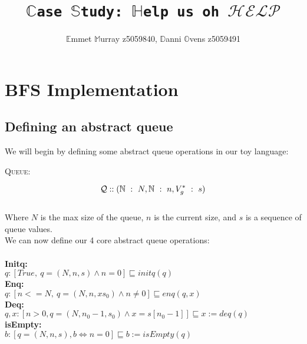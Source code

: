 \documentclass[a4paper]{scrartcl}
\title{\texttt{$\mathbb{C}$ase $\mathbb{S}$tudy: $\mathbb{H}$elp us oh $\mathcal{HELP}$}}
\author{$\mathbb{E}$mmet $\mathbb{M}$urray z5059840, $\mathbb{D}$anni $\mathbb{O}$vens z5059491}
\newcommand{\N}{\mathbb{N}}
\newcommand{\refinedby}{\sqsubseteq} %
\begin{document}
\maketitle
\section{BFS Implementation}
%
\subsection{Defining an abstract queue}
We will begin by defining some abstract queue operations in our toy language: \\
\begin{center}
{\LARGE{\textsc{Queue:}}\normalsize}
\end{center}
\begin{equation*}
\mathcal{Q} :: ( \N~:~N, \N~:~n, V_{g}^{*}~:~s ) \\
\end{equation*} \\
%
Where $N$ is the max size of the queue, $n$ is the current size, and $s$ is a sequence of queue values. \\
%
We can now define our 4 core abstract queue operations: \\ \\
%
\textbf{Initq:} \\
$q : [True, ~ q = ( N, n, s) \land n = 0] \refinedby initq(q)$ \\
\textbf{Enq:} \\
$q : [n <= N, ~ q = ( N, n, xs_0) \land n \neq 0] \refinedby enq(q, x)$ \\
\textbf{Deq:} \\
$q,x : [n > 0, q = (N, n_0-1, s_0) \land x = s[n_0 - 1]] \refinedby x := deq(q)$ \\
\textbf{isEmpty:} \\
$b : [q = (N, n, s), b \iff n = 0 ] \refinedby b := isEmpty(q)$\\
%
\end{document}
